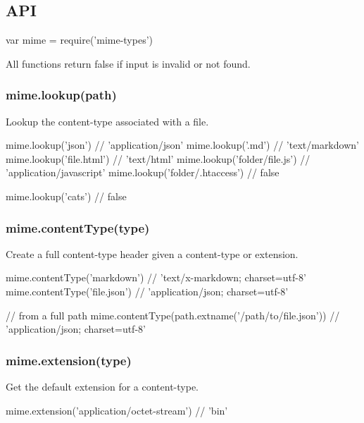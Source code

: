 \subsection*{A\+PI}


\begin{DoxyCode}
var mime = require('mime-types')
\end{DoxyCode}


All functions return {\ttfamily false} if input is invalid or not found.

\subsubsection*{mime.\+lookup(path)}

Lookup the content-\/type associated with a file.


\begin{DoxyCode}
mime.lookup('json')             // 'application/json'
mime.lookup('.md')              // 'text/markdown'
mime.lookup('file.html')        // 'text/html'
mime.lookup('folder/file.js')   // 'application/javascript'
mime.lookup('folder/.htaccess') // false

mime.lookup('cats') // false
\end{DoxyCode}


\subsubsection*{mime.\+content\+Type(type)}

Create a full content-\/type header given a content-\/type or extension.


\begin{DoxyCode}
mime.contentType('markdown')  // 'text/x-markdown; charset=utf-8'
mime.contentType('file.json') // 'application/json; charset=utf-8'

// from a full path
mime.contentType(path.extname('/path/to/file.json')) // 'application/json; charset=utf-8'
\end{DoxyCode}


\subsubsection*{mime.\+extension(type)}

Get the default extension for a content-\/type.


\begin{DoxyCode}
mime.extension('application/octet-stream') // 'bin'
\end{DoxyCode}


